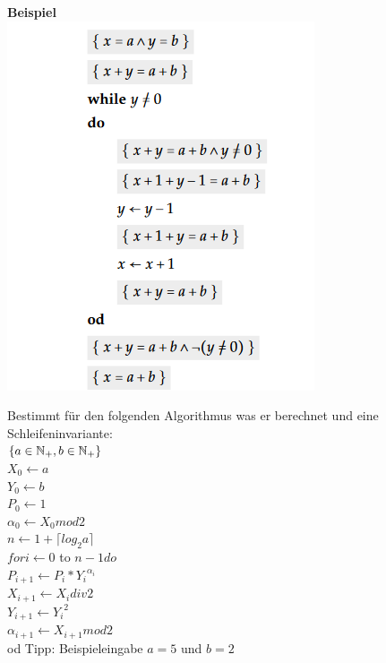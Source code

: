 \documentclass{beamer}
\begin{document}
\begin{frame}
	\textbf{Beispiel}\\
	\includegraphics[scale=0.7]{images/do_od_loes.png}
\end{frame}

\begin{frame}
    Bestimmt für den folgenden Algorithmus was er berechnet und eine 
Schleifeninvariante: \\
$\{a \in \mathbb{N}_+, b \in \mathbb{N}_+\}$ \\
$X_0 \leftarrow a$ \\
$Y_0 \leftarrow b $\\
$P_0 \leftarrow 1 $\\
$\alpha_0 \leftarrow X_0 mod  2$ \\
$n \leftarrow 1 + \lceil log_2 a \rceil $\\
$for i \leftarrow 0$ to $n-1 do $ \\
\hspace{5mm}
$P_{i+1} \leftarrow P_i * {Y_i}^{\alpha_i}$ \\
\hspace{5mm}
$X_{i+1} \leftarrow X_i div 2$ \\
\hspace{5mm}
$Y_{i+1} \leftarrow {Y_i}^2$ \\
\hspace{5mm}
$\alpha_{i+1} \leftarrow X_{i+1} mod 2$ \\
od 
\newline \newline
Tipp: Beispieleingabe $a = 5$ und $b = 2$
\end{frame}



\end{document}
